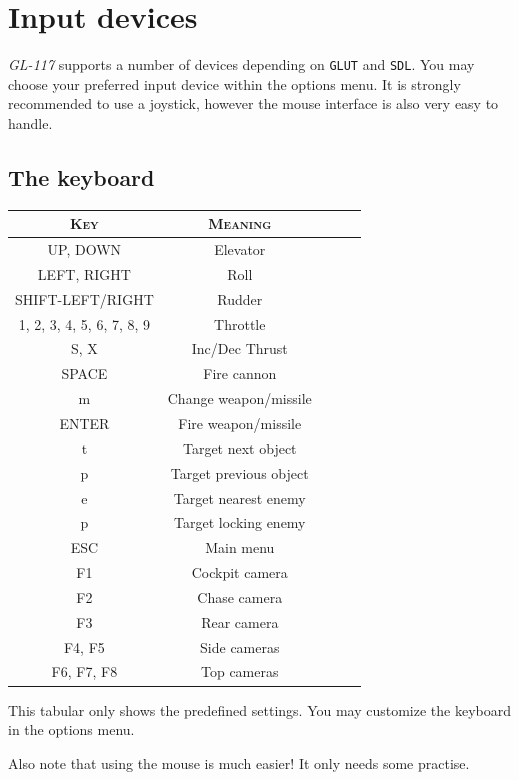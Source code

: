 \section{Input devices}
\label{sec:input_devices}

\emph{GL-117} supports a number of devices depending on \texttt{GLUT} and \texttt{SDL}.
You may choose your preferred input device within the options menu.
It is strongly recommended to use a joystick, however the mouse interface
is also very easy to handle.

\subsection{The keyboard}
\label{subsec:keyboard}

\begin{center}
\begin{tabular}{|c|c|l|l|l|}
\hline
\textsc{Key} & \textsc{Meaning}\\\hline
UP, DOWN & Elevator\\
LEFT, RIGHT & Roll\\
SHIFT-LEFT/RIGHT & Rudder\\
1, 2, 3, 4, 5, 6, 7, 8, 9 & Throttle\\
S, X & Inc/Dec Thrust\\
\hline
SPACE & Fire cannon\\
m & Change weapon/missile\\
ENTER & Fire weapon/missile\\
\hline
t & Target next object\\
p & Target previous object\\
e & Target nearest enemy\\
p & Target locking enemy\\
\hline
ESC & Main menu\\
\hline
F1 & Cockpit camera\\
F2 & Chase camera\\
F3 & Rear camera\\
F4, F5 & Side cameras\\
F6, F7, F8 & Top cameras\\
\hline
\end{tabular}
\end{center}

This tabular only shows the predefined settings. You may customize the
keyboard in the options menu.

Also note that using the mouse is much easier! It only needs some practise.


